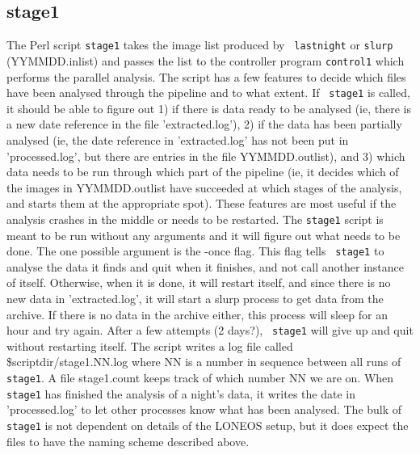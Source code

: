 \documentclass{article}
\begin{document}
\subsection{stage1}

The Perl script {\tt stage1} takes the image list produced by {\tt
lastnight} or {\tt slurp} (YYMMDD.inlist) and passes the list to the
controller program {\tt control1} which performs the parallel
analysis.  The script has a few features to decide which files have
been analysed through the pipeline and to what extent.  If {\tt
stage1} is called, it should be able to figure out 1) if there is data
ready to be analysed (ie, there is a new date reference in the file
'extracted.log'), 2) if the data has been partially analysed (ie, the
date reference in 'extracted.log' has not been put in 'processed.log',
but there are entries in the file YYMMDD.outlist), and 3) which data
needs to be run through which part of the pipeline (ie, it decides
which of the images in YYMMDD.outlist have succeeded at which stages
of the analysis, and starts them at the appropriate spot).  These
features are most useful if the analysis crashes in the middle or
needs to be restarted.  The {\tt stage1} script is meant to be run
without any arguments and it will figure out what needs to be done.
The one possible argument is the -once flag.  This flag tells {\tt
stage1} to analyse the data it finds and quit when it finishes, and
not call another instance of itself.  Otherwise, when it is done, it
will restart itself, and since there is no new data in
'extracted.log', it will start a slurp process to get data from the
archive.  If there is no data in the archive either, this process will
sleep for an hour and try again.  After a few attempts (2 days?), {\tt
stage1} will give up and quit without restarting itself.  The script
writes a log file called \$scriptdir/stage1.NN.log where NN is a
number in sequence between all runs of {\tt stage1}.  A file
stage1.count keeps track of which number NN we are on.  When {\tt
stage1} has finished the analysis of a night's data, it writes the
date in 'processed.log' to let other processes know what has been
analysed.  The bulk of {\tt stage1} is not dependent on details of the
LONEOS setup, but it does expect the files to have the naming scheme
described above.
\end{document}
